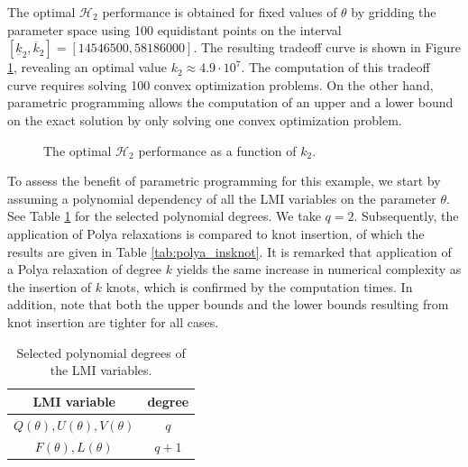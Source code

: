 \documentclass{article}
\newcommand{\ppar}{\theta}                          %
\newcommand{\Htwo}{\mathcal{H}_2}
\begin{document}
The optimal $\Htwo$ performance is obtained for fixed values of $\ppar$ by gridding the parameter space using 100 equidistant points on the interval $[ \underline{k}_2,\overline{k}_2] = [14546500,58186000]$. The resulting tradeoff curve is shown in Figure \ref{fig:sampled}, revealing an optimal value $k_2 \approx 4.9 \cdot 10^7$. The computation of this tradeoff curve requires solving 100 convex optimization problems. On the other hand, parametric programming allows the computation of an upper and a lower bound on the exact solution by only solving one convex optimization problem.

\begin{figure}
\centering

\caption{The optimal $\Htwo$ performance as a function of $k_2$.}
\label{fig:sampled}
\end{figure}

To assess the benefit of parametric programming for this example, we start by assuming a polynomial dependency of all the LMI variables on the parameter $\ppar$. See Table \ref{tab:degrees} for the selected polynomial degrees. We take $q = 2$. Subsequently, the application of Polya relaxations is compared to knot insertion, of which the results are given in Table \ref{tab:polya_insknot}. It is remarked that application of a Polya relaxation of degree $k$ yields the same increase in numerical complexity as the insertion of $k$ knots, which is confirmed by the computation times. In addition, note that both the upper bounds and the lower bounds resulting from knot insertion are tighter for all cases.

\begin{table}
	\centering
	\caption{Selected polynomial degrees of the LMI variables.} \vspace{0.2cm}
	\label{tab:degrees}
	\begin{tabular}{cc}
		\toprule
	  LMI variable & degree \\
	  \midrule
		$Q(\ppar),U(\ppar),V(\ppar)$ & $q$ \\
		$F(\ppar), L(\ppar)$ & $q+1$ \\
		\bottomrule
	\end{tabular}
\end{table}
\end{document}
